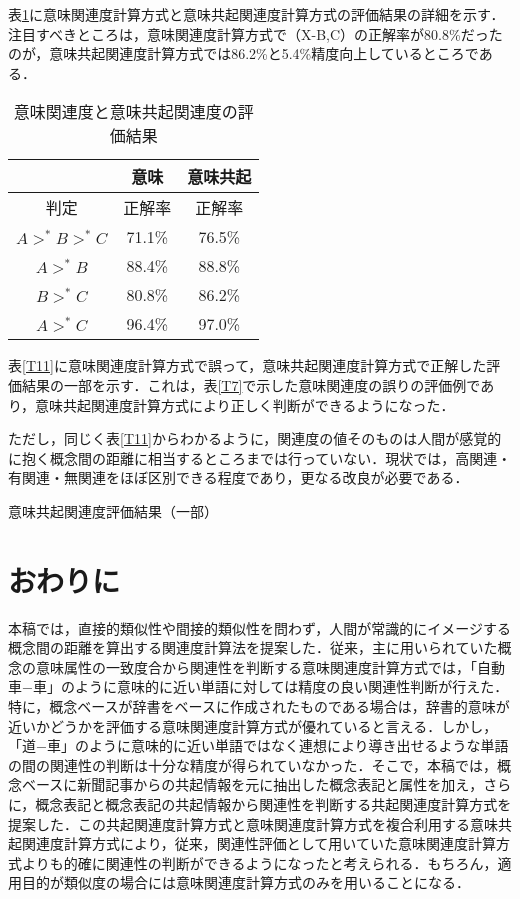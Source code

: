 表\ref{T10}に意味関連度計算方式と意味共起関連度計算方式の評価結果の詳細を示す．注目すべきところは，意味関連度計算方式で（X-B,C）の正解率が80.8\%だったのが，意味共起関連度計算方式では86.2\%と5.4\%精度向上しているところである．

\begin{table}[tb]
\caption[]{意味関連度と意味共起関連度の評価結果}
\label{T10}
\begin{center}
\begin{tabular}{|c|c|c|} \hline
                & 意味   & 意味共起 \\ \hline
判定            & 正解率 & 正解率   \\ \hline
$A >^* B >^* C$ & 71.1\% & 76.5\%   \\ \hline
$A >^* B$       & 88.4\% & 88.8\%   \\ \hline
$B >^* C$       & 80.8\% & 86.2\%   \\ \hline
$A >^* C$       & 96.4\% & 97.0\%   \\ \hline
\end{tabular}
\end{center}
\end{table}

表\ref{T11}に意味関連度計算方式で誤って，意味共起関連度計算方式で正解した評価結果の一部を示す．これは，表\ref{T7}で示した意味関連度の誤りの評価例であり，意味共起関連度計算方式により正しく判断ができるようになった．

ただし，同じく表\ref{T11}からわかるように，関連度の値そのものは人間が感覚的に抱く概念間の距離に相当するところまでは行っていない．現状では，高関連・有関連・無関連をほぼ区別できる程度であり，更なる改良が必要である．

\begin{table}[tb]
\caption[]{意味共起関連度評価結果（一部）}
\label{T11}
\begin{center}
\end{center}
\end{table}


\section{おわりに}

本稿では，直接的類似性や間接的類似性を問わず，人間が常識的にイメージする概念間の距離を算出する関連度計算法を提案した．従来，主に用いられていた概念の意味属性の一致度合から関連性を判断する意味関連度計算方式では，「自動車−車」のように意味的に近い単語に対しては精度の良い関連性判断が行えた．特に，概念ベースが辞書をベースに作成されたものである場合は，辞書的意味が近いかどうかを評価する意味関連度計算方式が優れていると言える．しかし，「道−車」のように意味的に近い単語ではなく連想により導き出せるような単語の間の関連性の判断は十分な精度が得られていなかった．そこで，本稿では，概念ベースに新聞記事からの共起情報を元に抽出した概念表記と属性を加え，さらに，概念表記と概念表記の共起情報から関連性を判断する共起関連度計算方式を提案した．この共起関連度計算方式と意味関連度計算方式を複合利用する意味共起関連度計算方式により，従来，関連性評価として用いていた意味関連度計算方式よりも的確に関連性の判断ができるようになったと考えられる．もちろん，適用目的が類似度の場合には意味関連度計算方式のみを用いることになる．



